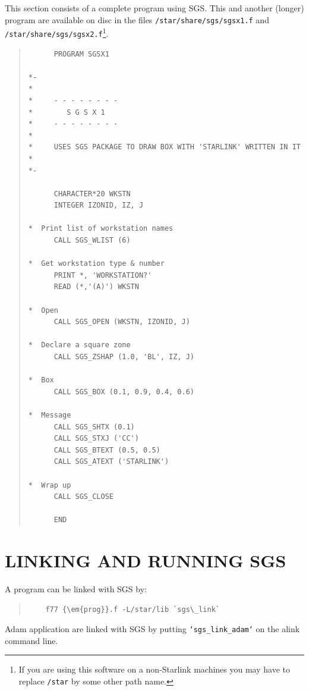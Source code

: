 \documentclass[11pt]{article}
\begin{document}
This section consists of a complete program using SGS.  This
and another (longer) program are available on disc in the
files {\tt /star/share/sgs/sgsx1.f} and
{\tt /star/share/sgs/sgsx2.f}\footnote{If you are using this
software on a non-Starlink machines you may have to replace {\tt /star} by some
other path name.}.
\begin{quote}
\begin{verbatim}
      PROGRAM SGSX1

*-
*
*     - - - - - - - -
*        S G S X 1
*     - - - - - - - -
*
*     USES SGS PACKAGE TO DRAW BOX WITH 'STARLINK' WRITTEN IN IT
*
*-

      CHARACTER*20 WKSTN
      INTEGER IZONID, IZ, J

*  Print list of workstation names
      CALL SGS_WLIST (6)

*  Get workstation type & number
      PRINT *, 'WORKSTATION?'
      READ (*,'(A)') WKSTN

*  Open
      CALL SGS_OPEN (WKSTN, IZONID, J)

*  Declare a square zone
      CALL SGS_ZSHAP (1.0, 'BL', IZ, J)

*  Box
      CALL SGS_BOX (0.1, 0.9, 0.4, 0.6)

*  Message
      CALL SGS_SHTX (0.1)
      CALL SGS_STXJ ('CC')
      CALL SGS_BTEXT (0.5, 0.5)
      CALL SGS_ATEXT ('STARLINK')

*  Wrap up
      CALL SGS_CLOSE

      END
\end{verbatim}
\end{quote}

\appendix
\section {LINKING AND RUNNING SGS}\label{app-linking}

A program can be linked with SGS by:
\begin{quote}
\begin{verbatim}
    f77 {\em{prog}}.f -L/star/lib `sgs\_link`
\end{verbatim}
\end{quote}
Adam application are linked with SGS by putting {\tt `sgs\_link\_adam`} on
the alink command line.
\end{document}
